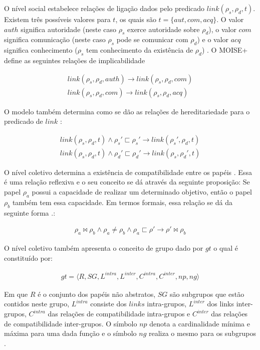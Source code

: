 O nível social estabelece relações de ligação dados pelo predicado $link(\rho_s,\rho_d,t)$. Existem três possíveis valores para $t$, os quais são $t = \{aut, com, acq\}$. O valor $auth$ significa autoridade (neste caso $\rho_s$ exerce autoridade sobre $\rho_d$), o valor $com$ significa comunicação (neste caso $\rho_s$ pode se comunicar com $\rho_d$) e o valor $acq$ significa conhecimento ($\rho_s$ tem conhecimento da existência de $\rho_d$) \cite{moiseframework} \cite{dynamicagenttemporalstruct}. O MOISE+ define as seguintes relações de implicabilidade

\begin{eqnarray}\nonumber
	link(\rho_s,\rho_d,auth) \to link(\rho_s,\rho_d,com) \nonumber \\
	link(\rho_s,\rho_d,com) \to link(\rho_s,\rho_d,acq) 
\end{eqnarray}

O modelo também determina como se dão as relações de hereditariedade para o predicado de $link$ \cite{moiseframework} \cite{dynamicagenttemporalstruct}: 

\begin{eqnarray}\nonumber
	link(\rho_s,\rho_d,t) \wedge \rho_s' \sqsubset \rho_s' \to link(\rho_s',\rho_d,t) \nonumber \\
	link(\rho_s,\rho_d,t) \wedge \rho_d' \sqsubset \rho_d' \to link(\rho_s,\rho_d',t) 	
\end{eqnarray}


O nível coletivo determina a existência de compatibilidade entre os papéis \cite{moiseframework}. Essa é uma relação reflexiva e o seu conceito se dá através da seguinte proposição: Se papel $\rho_a$ possui a capacidade de realizar um determinado objetivo, então o papel $\rho_b$ também tem essa capacidade. Em termos formais, essa relação se dá da seguinte forma \cite{moiseframework} \cite{deonticOne}.:

\begin{eqnarray}
	\rho_a \bowtie \rho_b \wedge \rho_a \neq \rho_b \wedge \rho_a \sqsubset \rho' \to \rho' \bowtie \rho_b 
\end{eqnarray}

O nível coletivo também apresenta o conceito de grupo dado por $gt$ o qual é constituído por:

\begin{eqnarray}
	gt = \langle R,SG,L^{intra},L^{inter},C^{intra},C^{inter},np,ng\rangle 
\end{eqnarray}

Em que $R$ é o conjunto dos papéis não abstratos, $SG$ são subgrupos que estão contidos neste grupo, $L^{intra}$ consiste dos $links$ intra-grupos, $L^{inter}$ dos links inter-grupos, 
$C^{intra}$ das relações de compatibilidade intra-grupos e $C^{inter}$ das relações de compatibilidade inter-grupos. O símbolo $np$ denota a cardinalidade mínima e máxima para uma dada 
função e o símbolo $ng$ realiza o mesmo para os subgrupos \cite{moiseframework}. 

